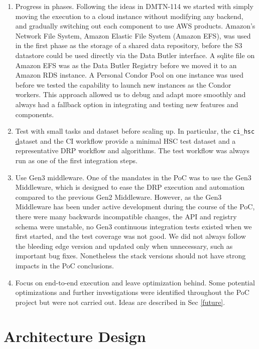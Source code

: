 \begin{enumerate}
\item
Progress in phases.
Following the ideas in DMTN-114 we started with simply moving the execution to a cloud instance without modifying any backend, and gradually switching out each component to use AWS products.
Amazon's Network File System, Amazon Elastic File System (Amazon EFS), was used in the first phase as the storage of a shared data repository, before the S3 datastore could be used directly via the Data Butler interface.
A sqlite file on Amazon EFS was as the Data Butler Registry before we moved it to an Amazon RDS instance.
A Personal Condor Pool on one instance was used before we tested the capability to launch new instances as the Condor workers.
This approach allowed us to debug and adapt more smoothly and always had a fallback option in integrating and testing new features and components.
\item
Test with small tasks and dataset before scaling up.
In particular, the \texttt{ci\_hsc} \href{https://github.com/lsst/ci\_hsc} dataset and the CI workflow provide a minimal HSC test dataset and a representative DRP workflow and algorithms.
The test workflow was always run as one of the first integration steps.
\item
Use Gen3 middleware.
One of the mandates in the PoC was to use the Gen3 Middleware, which is designed to ease the DRP execution and automation compared to the previous Gen2 Middleware.
However, as the Gen3 Middleware has been under active development during the course of the PoC, there were many backwards incompatible changes, the API and registry schema were unstable, no Gen3 continuous integration tests existed when we first started, and the test coverage was not good.
We did not always follow the bleeding edge version and updated only when unnecessary, such as important bug fixes.
Nonetheless the stack versions should not have strong impacts in the PoC conclusions.
\item
Focus on end-to-end execution and leave optimization behind.
Some potential optimizations and further investigations were identified throughout the PoC project but were not carried out.
Ideas are described in Sec \ref{future}.
\end{enumerate}


\section{Architecture Design}

